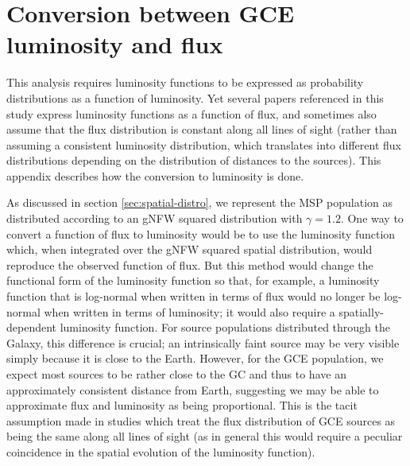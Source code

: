 \documentclass[letter,11pt]{article}
\begin{document}
\section{Conversion between GCE luminosity and flux}
\label{app:lum-to-flux}
This analysis requires luminosity functions to be expressed as probability distributions as a function of luminosity. Yet several papers referenced in this study express luminosity functions as a function of flux, and sometimes also assume that the flux distribution is constant along all lines of sight (rather than assuming a consistent luminosity distribution, which translates into different flux distributions depending on the distribution of distances to the sources). This appendix describes how the conversion to luminosity is done.

As discussed in section \ref{sec:spatial-distro}, we represent the MSP population as distributed according to an gNFW squared distribution with $\gamma = 1.2$. One way to convert a function of flux to luminosity would be to use the luminosity function which, when integrated over the gNFW squared spatial distribution, would reproduce the observed function of flux. But this method would change the functional form of the luminosity function so that, for example, a luminosity function that is log-normal when written in terms of flux would no longer be log-normal when written in terms of luminosity; it would also require a spatially-dependent luminosity function. For source populations distributed through the Galaxy, this difference is crucial; an intrinsically faint source may be very visible simply because it is close to the Earth. However, for the GCE population, we expect most sources to be rather close to the GC and thus to have an approximately consistent distance from Earth, suggesting we may be able to approximate flux and luminosity as being proportional. This is the tacit assumption made in studies which treat the flux distribution of GCE sources as being the same along all lines of sight (as in general this would require a peculiar coincidence in the spatial evolution of the luminosity function).
\end{document}
